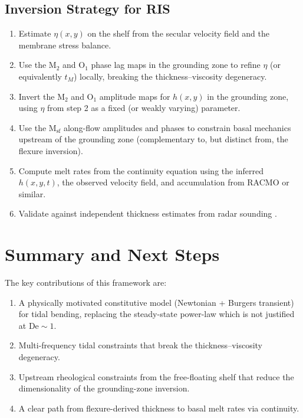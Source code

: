 \documentclass[11pt,letterpaper]{article}
\newcommand{\De}{\text{De}}
\begin{document}
\subsection{Inversion Strategy for RIS}
\label{sec:rutford_inversion}

\begin{enumerate}
  \item Estimate $\eta(x,y)$ on the shelf from the secular velocity field and the membrane stress balance.
  \item Use the M$_2$ and O$_1$ phase lag maps in the grounding zone to refine $\eta$ (or equivalently $t_M$) locally, breaking the thickness--viscosity degeneracy.
  \item Invert the M$_2$ and O$_1$ amplitude maps for $h(x,y)$ in the grounding zone, using $\eta$ from step 2 as a fixed (or weakly varying) parameter.
  \item Use the M$_{\text{sf}}$ along-flow amplitudes and phases to constrain basal mechanics upstream of the grounding zone (complementary to, but distinct from, the flexure inversion).
  \item Compute melt rates from the continuity equation using the inferred $h(x,y,t)$, the observed velocity field, and accumulation from RACMO or similar.
  \item Validate against independent thickness estimates from radar sounding \citep{Fretwell2013,King2016}.
\end{enumerate}

\section{Summary and Next Steps}
\label{sec:summary}

The key contributions of this framework are:
\begin{enumerate}
  \item A physically motivated constitutive model (Newtonian + Burgers transient) for tidal bending, replacing the steady-state power-law which is not justified at $\De \sim 1$.
  \item Multi-frequency tidal constraints that break the thickness--viscosity degeneracy.
  \item Upstream rheological constraints from the free-floating shelf that reduce the dimensionality of the grounding-zone inversion.
  \item A clear path from flexure-derived thickness to basal melt rates via continuity.
\end{enumerate}
\end{document}
